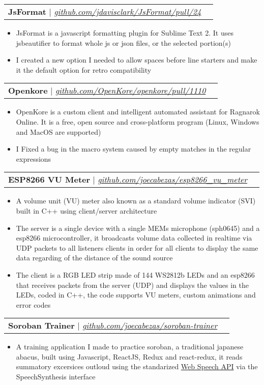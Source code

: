 \documentclass[letterpaper,11pt]{article}
\makeatletter
\newcommand{\resumeItem}[1]{
  \item\small{
    {#1 \vspace{-2pt}}
  }
}
\newcommand{\resumeProjectHeading}[2]{
    \vspace{-2pt}\item
    \begin{tabular*}{0.97\textwidth}{l@{\extracolsep{\fill}}r}
      \small#1 & #2 \\
    \end{tabular*}\vspace{-7pt}
}
\newcommand{\resumeItemListStart}{\begin{itemize}}
\newcommand{\resumeItemListEnd}{\end{itemize}\vspace{-5pt}}
\makeatother
\begin{document}
      \resumeProjectHeading
        {\textbf{JsFormat} $|$ \emph{\href{https://github.com/jdavisclark/JsFormat/pull/24}{\color{blue}github.com/jdavisclark/JsFormat/pull/24}}}{}
          \resumeItemListStart
            \resumeItem{JsFormat is a javascript formatting plugin for Sublime Text 2. It uses jsbeautifier to format whole js or json files, or the selected portion(s)}
            \resumeItem{I created a new option I needed to allow spaces before line starters and make it the default option for retro compatibility}
          \resumeItemListEnd
      
      \resumeProjectHeading
        {\textbf{Openkore} $|$ \emph{\href{https://github.com/OpenKore/openkore/pull/1110}{\color{blue}github.com/OpenKore/openkore/pull/1110}}}{}
          \resumeItemListStart
            \resumeItem{OpenKore is a custom client and intelligent automated assistant for Ragnarok Online. It is a free, open source and cross-platform program (Linux, Windows and MacOS are supported)}
            \resumeItem{I Fixed a bug in the macro system caused by empty matches in the regular expressions}
          \resumeItemListEnd
      
      \resumeProjectHeading
        {\textbf{ESP8266 VU Meter} $|$ \emph{\href{https://github.com/joecabezas/esp8266\_vu\_meter}{\color{blue}github.com/joecabezas/esp8266\_vu\_meter}}}{}
          \resumeItemListStart
            \resumeItem{A volume unit (VU) meter also known as a standard volume indicator (SVI) built in C++ using client/server architecture}
            \resumeItem{The server is a single device with a single MEMs microphone (sph0645) and a esp8266 microcontroller, it broadcasts volume data collected in realtime via UDP packets to all listeners clients in order for all clients to display the same data regarding of the distance of the sound source}
            \resumeItem{The client is a RGB LED strip made of 144 WS2812b LEDs and an esp8266 that receives packets from the server (UDP) and displays the values in the LEDs, coded in C++, the code supports VU meters, custom animations and error codes}
          \resumeItemListEnd
      
      \resumeProjectHeading
        {\textbf{Soroban Trainer} $|$ \emph{\href{https://github.com/joecabezas/soroban-trainer}{\color{blue}github.com/joecabezas/soroban-trainer}}}{}
          \resumeItemListStart
            \resumeItem{A training application I made to practice soroban, a traditional japanese abacus, built using Javascript, ReactJS, Redux and react-redux, it reads summatory excersices outloud using the standarized \href{https://developer.mozilla.org/en-US/docs/Web/API/Web_Speech_API}{Web Speech API} via the SpeechSynthesis interface}
          \resumeItemListEnd
      
\end{document}
